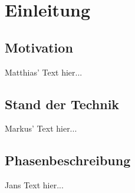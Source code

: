 \chapter{Einleitung}

\section{Motivation}
Matthias' Text hier...

\section{Stand der Technik}
Markus' Text hier...

\section{Phasenbeschreibung}
Jans Text hier...

